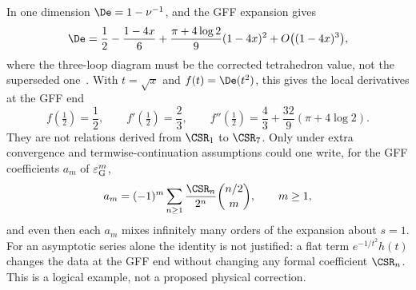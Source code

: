 In one dimension $\De=1-\nu^{-1}$, and the GFF expansion gives
\begin{equation}
 \De=\frac12-\frac{1-4x}{6}+\frac{\pi+4\log2}{9}(1-4x)^2+O\bigl((1-4x)^3\bigr),
\end{equation}
where the three-loop diagram must be the corrected tetrahedron value, not the superseded
one~\cite{sri:Benedetti:2020rrq,sri:Benedetti:2024mqx}. With $t=\sqrt x$ and $f(t)=\De(t^2)$, this gives the local derivatives
at the GFF end
\begin{equation}
 f(\tfrac12)=\frac12,\qquad f'(\tfrac12)=\frac23,\qquad f''(\tfrac12)=\frac43+\frac{32}{9}(\pi+4\log2).
\end{equation}
They are not relations derived from $\CSR_1$ to $\CSR_7$. Only under extra convergence and termwise-continuation
assumptions could one write, for the GFF coefficients $a_m$ of $\varepsilon_{\rm G}^m$,
\begin{equation}
 a_m=(-1)^m\sum_{n\ge1}\frac{\CSR_n}{2^n}\binom{n/2}{m},\qquad m\ge1,
\end{equation}
and even then each $a_m$ mixes infinitely many orders of the expansion about $s=1$. For an asymptotic series alone the
identity is not justified: a flat term $e^{-1/t^2}h(t)$ changes the data at the GFF end without changing any formal
coefficient $\CSR_n$. This is a logical example, not a proposed physical correction.

